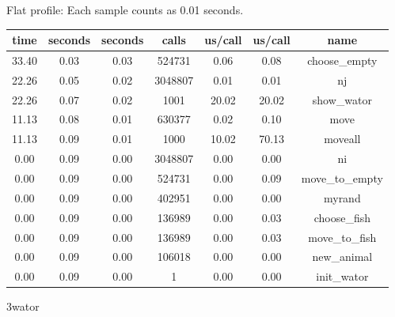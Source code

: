 \documentclass[a4paper,10pt]{article}
\begin{document}
Flat profile:
Each sample counts as 0.01 seconds.
\begin{center}
  \begin{tabular}{| c | c | c | c | c | c | c |}
    \hline
 time &   seconds &   seconds &    calls &  us/call &   us/call &   name \\ \hline    
 33.40 &      0.03 &     0.03 &   524731 &     0.06 &      0.08 &   choose\_empty \\ \hline
 22.26 &      0.05 &     0.02 &  3048807 &     0.01 &      0.01 &   nj \\ \hline
 22.26 &      0.07 &     0.02 &     1001 &    20.02 &     20.02 &   show\_wator \\ \hline
 11.13 &      0.08 &     0.01 &   630377 &     0.02 &      0.10 &   move \\ \hline
 11.13 &      0.09 &     0.01 &     1000 &    10.02 &     70.13 &   moveall \\ \hline
  0.00 &      0.09 &     0.00 &  3048807 &     0.00 &      0.00 &   ni \\ \hline
  0.00 &      0.09 &     0.00 &   524731 &     0.00 &      0.09 &   move\_to\_empty \\ \hline
  0.00 &      0.09 &     0.00 &   402951 &     0.00 &      0.00 &   myrand \\ \hline
  0.00 &      0.09 &     0.00 &   136989 &     0.00 &      0.03 &   choose\_fish \\ \hline
  0.00 &      0.09 &     0.00 &   136989 &     0.00 &      0.03 &   move\_to\_fish \\ \hline
  0.00 &      0.09 &     0.00 &   106018 &     0.00 &      0.00 &   new\_animal \\ \hline
  0.00 &      0.09 &     0.00 &        1 &     0.00 &      0.00 &   init\_wator \\ \hline
  \end{tabular}
\end{center}

3wator
\end{document}
